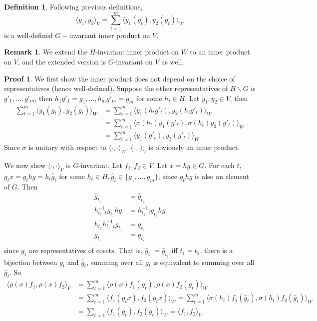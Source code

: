 \documentclass{book}
\newcommand{\inner}[1]{\langle #1 \rangle}
\theoremstyle{definition}
\newtheorem{definition}[lemma]{Definition}
\theoremstyle{remarkstyle}
\newtheorem*{remark}{Remark}%
\newtheorem*{myproof}{Proof}%
\begin{document}
\begin{definition}
    Following previous definitions, 
    $$
    \inner{y_1,y_2}_V = \sum^m_{t=1}\inner{y_1(g_t), y_2(g_t) }_W
    $$
    is a well-defined $G-$invariant inner product on $V$.
\end{definition}
\begin{remark}
    We extend the $H$-invariant inner product on $W$ to an inner product on $V$, and the extended version is $G$-invariant on $V$ as well.
\end{remark}
\begin{myproof}
    We first show the inner product does not depend on the choice of representatives (hence well-defined). Suppose the other representatives of $H\backslash G$ is $g'_1,\dots,g'_m$, then $h_1g'_1=g_1, \dots, h_mg'_m=g_m$ for some $h_i\in H$. Let $y_1,y_2\in V$, then 
    \begin{align*}
        \sum^m_{t=1}\inner{y_1(g_t), y_2(g_t) }_W 
        &= \sum^m_{t=1}\inner{y_1(h_tg'_t), y_2(h_tg'_t) }_W \\
        &= \sum^m_{t=1}\inner{\sigma(h_t)y_1(g'_t),\sigma(h_t)y_2(g'_t) }_W \\
        &= \sum^m_{t=1}\inner{y_1(g'_t),y_2(g'_t) }_W
    \end{align*}
    Since $\sigma$ is unitary with respect to $\inner{\cdot,\cdot}_W$. $\inner{\cdot,\cdot}_V$ is obviously an inner product. \newline

    We now show $\inner{\cdot,\cdot}_V$ is $G$-invariant. Let $f_1,f_2\in V$. Let $x=hg\in G$. For each $t$, $g_tx=g_thg=h_t\hat{g}_t$ for some $h_t\in H, \hat{g}_t\in \{g_1,\dots,g_m\}$, since $g_thg$ is also an element of $G$. Then
    \begin{align*}
        \hat{g}_{t_1} &= \hat{g}_{t_2} \\
        h^{-1}_{t_1}_tg_{t_1}hg &= h^{-1}_{t_2}_tg_{t_2}hg \\
        h_{t_2}h^{-1}_{t_1}_tg_{t_1} &= g_{t_2} \\
        g_{t_1} &= g_{t_2} \\
    \end{align*}
    since $g_t$ are representatives of cosets. That is, $\hat{g}_{t_1}=\hat{g}_{t_1}$ iff $t_1=t_2$, there is a bijection between $g_t$ and $\hat{g}_t$, summing over all $g_t$ is equivalent to summing over all $\hat{g}_t$. So
    \begin{align*}
        \inner{\rho(x)f_1, \rho(x)f_2}_V 
        &= \sum_{t=1}^m\inner{\rho(x)f_1(g_t), \rho(x)f_2(g_t)}_W \\
        &= \sum_{t=1}^m\inner{f_1(g_tx),f_2(g_tx)}_W = \sum_{t=1}^m\inner{\sigma(h_t)f_1(\hat{g}_t),\sigma(h_t)f_2(\hat{g}_t)}_W \\
        &= \sum_{t=1}\inner{f_1(g_t),f_2(g_t)}_W = \inner{f_1,f_2}_V
    \end{align*}
    \newline
\end{myproof}
\end{document}
